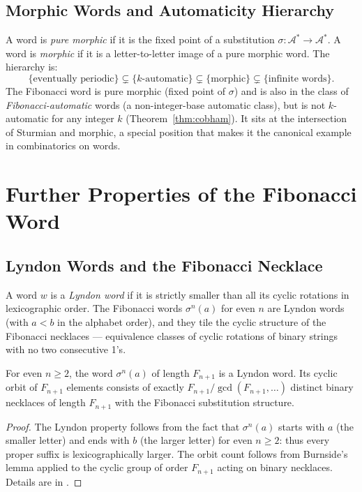 \subsection{Morphic Words and Automaticity Hierarchy}
\label{subsec:ch19-morphic}

A word is \emph{pure morphic} if it is the fixed point of a
substitution \(\sigma\colon\mathcal{A}^*\to\mathcal{A}^*\).
A word is \emph{morphic} if it is a letter-to-letter image of a
pure morphic word.  The hierarchy is:
\[
  \{\text{eventually periodic}\}
  \subsetneq \{k\text{-automatic}\}
  \subsetneq \{\text{morphic}\}
  \subsetneq \{\text{infinite words}\}.
\]
The Fibonacci word is pure morphic (fixed point of \(\sigma\)) and
is also in the class of \emph{Fibonacci-automatic} words (a
non-integer-base automatic class), but is not \(k\)-automatic for
any integer \(k\) (Theorem~\ref{thm:cobham}).  It sits at the
intersection of Sturmian and morphic, a special position that
makes it the canonical example in combinatorics on words.

\section{Further Properties of the Fibonacci Word}
\label{sec:ch19-further}

\subsection{Lyndon Words and the Fibonacci Necklace}
\label{subsec:ch19-lyndon}

A word \(w\) is a \emph{Lyndon word} if it is strictly smaller than
all its cyclic rotations in lexicographic order.  The Fibonacci words
\(\sigma^n(a)\) for even \(n\) are Lyndon words (with
\(a<b\) in the alphabet order), and they tile the cyclic structure
of the Fibonacci necklaces --- equivalence classes of cyclic
rotations of binary strings with no two consecutive 1's.

\begin{proposition}\label{prop:lyndon}
  For even \(n\geq 2\), the word \(\sigma^n(a)\) of length \(F_{n+1}\)
  is a Lyndon word.  Its cyclic orbit of \(F_{n+1}\) elements consists
  of exactly \(F_{n+1}/\gcd(F_{n+1},\ldots)\) distinct binary necklaces
  of length \(F_{n+1}\) with the Fibonacci substitution structure.
\end{proposition}
\begin{proof}
  The Lyndon property follows from the fact that \(\sigma^n(a)\)
  starts with \(a\) (the smaller letter) and ends with \(b\)
  (the larger letter) for even \(n\geq 2\): thus every proper suffix
  is lexicographically larger.  The orbit count follows from Burnside's
  lemma applied to the cyclic group of order \(F_{n+1}\) acting on
  binary necklaces.  Details are in
  \cite[\S5.1]{pytheasfogg2002substitutions}.
\end{proof}

